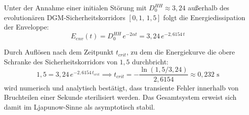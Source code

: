 \documentclass[11pt,a4paper]{article}
\begin{document}
	Unter der Annahme einer initialen Störung mit $D_0^{HH} \approx 3{,}24$ außerhalb des evolutionären DGM-Sicherheitskorridors $[0{,}1,\, 1{,}5]$ folgt die Energiedissipation der Enveloppe:
	\begin{equation}
		E_{env}(t) = D_0^{HH} \, e^{-2\alpha t} = 3{,}24 \, e^{-2{,}6154 \, t}
	\end{equation}
	
	Durch Auflösen nach dem Zeitpunkt $t_{crit}$, zu dem die Energiekurve die obere Schranke des Sicherheitskorridors von $1{,}5$ durchbricht:
	\begin{equation}
		1{,}5 = 3{,}24 \, e^{-2{,}6154 \, t_{crit}} \implies t_{crit} = -\frac{\ln(1{,}5 / 3{,}24)}{2{,}6154} \approx 0{,}232 \text{ s}
	\end{equation}
	wird numerisch und analytisch bestätigt, dass transiente Fehler innerhalb von Bruchteilen einer Sekunde sterilisiert werden. Das Gesamtsystem erweist sich damit im Ljapunow-Sinne als asymptotisch stabil.
	
\end{document}
